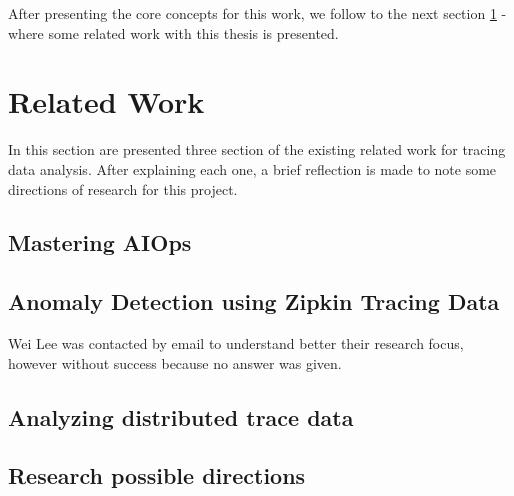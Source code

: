 After presenting the core concepts for this work, we follow to the next section \ref{sec:related_work} -  where some related work with this thesis is presented.

\section{Related Work}
\label{sec:related_work}

In this section are presented three section of the existing related work for tracing data analysis. After explaining each one, a brief reflection is made to note some directions of research for this project.

\subsection{Mastering AIOps}
\label{subsec:mastering_aiops}


\cite{mastering_aiops}

\subsection{Anomaly Detection using Zipkin Tracing Data}
\label{subsec:anomaly_detection_using_zipkin_tracing_data}


\cite{anomaly_detection_zipkin_tracing_data}

Wei Lee was contacted by email to understand better their research focus, however without success because no answer was given.

\subsection{Analyzing distributed trace data}
\label{subsec:analyzing_distributed_trace_data}


\cite{analysisng_distributed_trace_data}

\subsection{Research possible directions}
\label{subsec:research_possible_directions}


